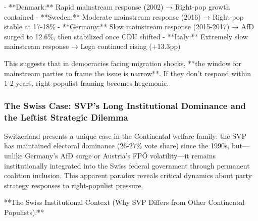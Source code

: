 - **Denmark:** Rapid mainstream response (2002) → Right-pop growth contained
- **Sweden:** Moderate mainstream response (2016) → Right-pop stable at 17-18\%
- **Germany:** Slow mainstream response (2015-2017) → AfD surged to 12.6\%, then stabilized once CDU shifted
- **Italy:** Extremely slow mainstream response → Lega continued rising (+13.3pp)

This suggests that in democracies facing migration shocks, **the window for mainstream parties to frame the issue is narrow**. If they don't respond within 1-2 years, right-populist framing becomes hegemonic.

\subsubsection{The Swiss Case: SVP's Long Institutional Dominance and the Leftist Strategic Dilemma}

Switzerland presents a unique case in the Continental welfare family: the SVP has maintained electoral dominance (26-27\% vote share) since the 1990s, but—unlike Germany's AfD surge or Austria's FPÖ volatility—it remains institutionally integrated into the Swiss federal government through permanent coalition inclusion. This apparent paradox reveals critical dynamics about party strategy responses to right-populist pressure.

**The Swiss Institutional Context (Why SVP Differs from Other Continental Populists):**

